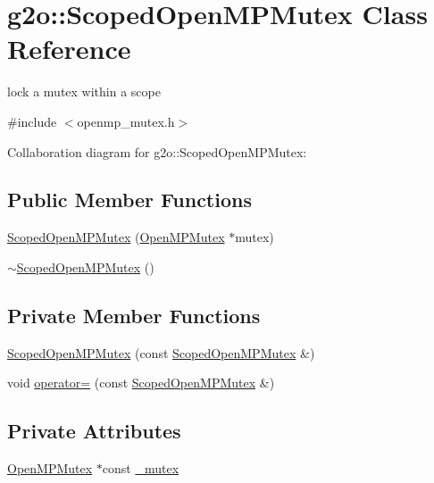 \hypertarget{classg2o_1_1ScopedOpenMPMutex}{}\section{g2o\+:\+:Scoped\+Open\+M\+P\+Mutex Class Reference}
\label{classg2o_1_1ScopedOpenMPMutex}


lock a mutex within a scope  




{\ttfamily \#include $<$openmp\+\_\+mutex.\+h$>$}



Collaboration diagram for g2o\+:\+:Scoped\+Open\+M\+P\+Mutex\+:
\subsection*{Public Member Functions}
\begin{DoxyCompactItemize}
\item 
\hyperlink{classg2o_1_1ScopedOpenMPMutex_abb18bffae04b138447870b58ab158f56}{Scoped\+Open\+M\+P\+Mutex} (\hyperlink{classg2o_1_1OpenMPMutex}{Open\+M\+P\+Mutex} $\ast$mutex)
\item 
\hyperlink{classg2o_1_1ScopedOpenMPMutex_af3c190c5fba832ce48db9edf6ea10552}{$\sim$\+Scoped\+Open\+M\+P\+Mutex} ()
\end{DoxyCompactItemize}
\subsection*{Private Member Functions}
\begin{DoxyCompactItemize}
\item 
\hyperlink{classg2o_1_1ScopedOpenMPMutex_ab293e6a549bb2a546e53ebd9a1b7c2aa}{Scoped\+Open\+M\+P\+Mutex} (const \hyperlink{classg2o_1_1ScopedOpenMPMutex}{Scoped\+Open\+M\+P\+Mutex} \&)
\item 
void \hyperlink{classg2o_1_1ScopedOpenMPMutex_a9c41c4feafc825eae71097d2e6896fb5}{operator=} (const \hyperlink{classg2o_1_1ScopedOpenMPMutex}{Scoped\+Open\+M\+P\+Mutex} \&)
\end{DoxyCompactItemize}
\subsection*{Private Attributes}
\begin{DoxyCompactItemize}
\item 
\hyperlink{classg2o_1_1OpenMPMutex}{Open\+M\+P\+Mutex} $\ast$const \hyperlink{classg2o_1_1ScopedOpenMPMutex_a6fc0c5ebf1c40a7de6821f9ba78ea68f}{\+\_\+mutex}
\end{DoxyCompactItemize}



